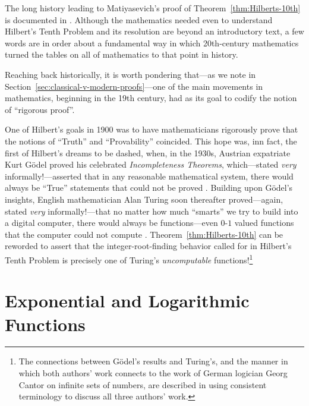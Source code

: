 The long history leading to Matiyasevich's proof of
Theorem~\ref{thm:Hilberts-10th} is documented in
\cite{Davis73,DavisH73,DavisMR76,Matiyasevich93}.  Although the
mathematics needed even to understand Hilbert's Tenth Problem and its
resolution are beyond an introductory text, a few words are in order
about a fundamental way in which 20th-century mathematics turned the
tables on all of mathematics to that point in history.

Reaching back historically, it is worth pondering that---as we note in
Section~\ref{sec:classical-v-modern-proofs}---one of the main movements
in mathematics, beginning in the 19th century, had as its goal to
codify the notion of ``rigorous proof''.

\noindent
One of Hilbert's goals in 1900 was to have mathematicians rigorously
prove that the notions of ``Truth'' and ``Provability'' coincided.
This hope was, inn fact, the first of Hilbert's dreams to be dashed,
when, in the 1930s, Austrian expatriate Kurt G\"{o}del
 proved his celebrated {\it Incompleteness
  Theorems}, 
which---stated {\em very} informally!---asserted that in any
reasonable mathematical system, there would always be ``True''
statements that could not be proved \cite{Goedel31}.  Building upon
G\"{o}del's insights, English mathematician Alan Turing
 soon thereafter proved---again, stated {\em very}
informally!---that no matter how much ``smarts'' we try to build into
a digital computer, there would always be functions---even $0$-$1$
valued functions that the computer could not compute \cite{Turing36}.
Theorem~\ref{thm:Hilberts-10th} can be reworded to assert that the
integer-root-finding behavior called for in Hilbert's Tenth Problem is
precisely one of Turing's {\it uncomputable}  functions!\footnote{The connections between G\"{o}del's
  results and Turing's, and the manner in which both authors' work
  connects to the work of German logician Georg Cantor 
 on infinite sets of numbers,
\cite{Cantor74,Cantor78} are described in \cite{Rosenberg09} using
consistent terminology to discuss all three authors' work.}



\section{Exponential and Logarithmic Functions}
\label{sec:exponential+logarithm}

